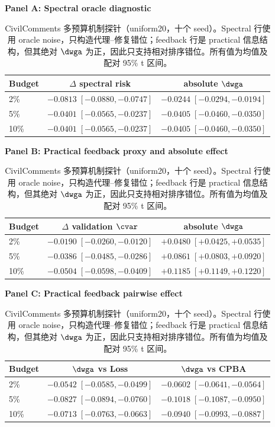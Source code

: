 \begin{table}[H]
\centering
\caption{CivilComments 多预算机制探针（uniform20，十个 seed）。Spectral 行使用 oracle noise，只构造代理--修复错位；feedback 行是 practical 信息结构，但其绝对 $\dwga$ 为正，因此只支持相对排序错位。所有值为均值及配对 95\% t 区间。}
\label{tab:s3-multibudget-zh}
\footnotesize
\setlength{\tabcolsep}{5pt}
\textbf{Panel A: Spectral oracle diagnostic}\par\vspace{0.25em}
\begin{tabular}{lcc}
\toprule
Budget & $\Delta$ spectral risk & absolute $\dwga$ \\
\midrule
2\% & $-0.0813\;[-0.0880,-0.0747]$ & $-0.0244\;[-0.0294,-0.0194]$ \\
5\% & $-0.0401\;[-0.0565,-0.0237]$ & $-0.0405\;[-0.0460,-0.0350]$ \\
10\% & $-0.0401\;[-0.0565,-0.0237]$ & $-0.0405\;[-0.0460,-0.0350]$ \\
\bottomrule
\end{tabular}\par
\vspace{0.75em}
\textbf{Panel B: Practical feedback proxy and absolute effect}\par\vspace{0.25em}
\begin{tabular}{lcc}
\toprule
Budget & $\Delta$ validation $\cvar$ & absolute $\dwga$ \\
\midrule
2\% & $-0.0190\;[-0.0260,-0.0120]$ & $+0.0480\;[+0.0425,+0.0535]$ \\
5\% & $-0.0386\;[-0.0485,-0.0286]$ & $+0.0861\;[+0.0803,+0.0920]$ \\
10\% & $-0.0504\;[-0.0598,-0.0409]$ & $+0.1185\;[+0.1149,+0.1220]$ \\
\bottomrule
\end{tabular}\par
\vspace{0.75em}
\textbf{Panel C: Practical feedback pairwise effect}\par\vspace{0.25em}
\begin{tabular}{lcc}
\toprule
Budget & $\dwga$ vs Loss & $\dwga$ vs CPBA \\
\midrule
2\% & $-0.0542\;[-0.0585,-0.0499]$ & $-0.0602\;[-0.0641,-0.0564]$ \\
5\% & $-0.0827\;[-0.0894,-0.0760]$ & $-0.1018\;[-0.1087,-0.0950]$ \\
10\% & $-0.0713\;[-0.0763,-0.0663]$ & $-0.0940\;[-0.0993,-0.0887]$ \\
\bottomrule
\end{tabular}\par
\end{table}
